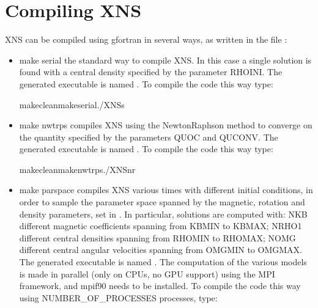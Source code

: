 \documentclass[letterpaper,10pt,english]{sphinxmanual}
\begin{document}
\chapter{Compiling XNS}
\label{\detokenize{makefile:compiling-xns}}\label{\detokenize{makefile::doc}}
\sphinxAtStartPar
XNS can be compiled using gfortran in several ways, as written in the file :
\begin{itemize}
\item {} 
\sphinxAtStartPar
make serial \sphinxhyphen{} the standard way to compile XNS. In this case a single solution is found with a central density specified by the parameter RHOINI. The generated executable is named . To compile the code this way type:

\begin{sphinxVerbatim}[commandchars=\\\{\}]
makecleanmakeserial./XNS\PYGZhy{}s
\end{sphinxVerbatim}

\item {} 
\sphinxAtStartPar
make nwtrps \sphinxhyphen{} compiles XNS using the Newton\sphinxhyphen{}Raphson method to converge on the quantity specified by the parameters QUOC and QUCONV. The generated executable is named . To compile the code this way type:

\begin{sphinxVerbatim}[commandchars=\\\{\}]
makecleanmakenwtrps./XNS\PYGZhy{}nr
\end{sphinxVerbatim}

\item {} 
\sphinxAtStartPar
make parspace \sphinxhyphen{} compiles XNS various times with different initial conditions, in order to sample the parameter space spanned by the magnetic, rotation and density parameters, set in . In particular, solutions are computed with: NKB different magnetic coefficients spanning from KBMIN to KBMAX; NRHO1 different central densities spanning from RHOMIN to RHOMAX; NOMG different central angular velocities spanning from OMGMIN to OMGMAX. The generated executable is named . The computation of the various models is made in parallel (only on CPUs, no GPU support) using the MPI framework, and mpif90 needs to be installed. To compile the code this way using NUMBER\_OF\_PROCESSES processes, type:


\end{itemize}
\end{document}
